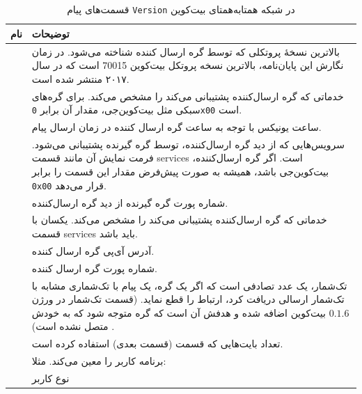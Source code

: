  	
 \begin{xltabular}{\textwidth}{|c|X|}
 	\caption{
	قسمت‌های پیام \texttt{Version} در شبکه همتا‌به‌همتای بیت‌کوین
\label{table:VersionMessage}}\\
\hline
\textbf{نام} & {\centering
	\textbf{توضیحات}		
} \\
\hline
\hline
{} & {
	بالاترین نسخهٔ پروتکلی که توسط گره ارسال کننده شناخته می‌شود.	در زمان نگارش این پایان‌نامه، بالاترین نسخه پروتکل بیت‌کوین 70015 است که در سال ۲۰۱۷ منتشر شده است.
} \\
\hline
{} & {
	خدماتی که گره ارسال‌کننده پشتیبانی می‌کند را مشخص می‌کند. برای گره‌های سبکی مثل بیت‌کوین‌جی، مقدار آن برابر \texttt{0x00} است.
} \\
\hline
{} & {
	ساعت یونیکس با توجه به ساعت گره ارسال کننده در زمان ارسال پیام.
} \\
\hline
{} & {
	سرویس‌هایی که از دید گره ارسال‌کننده، توسط گره گیرنده پشتیبانی می‌شود. فرمت نمایش آن مانند قسمت services است. اگر گره ارسال‌کننده، بیت‌کوین‌جی باشد، همیشه به صورت پیش‌فرض مقدار این قسمت را برابر \texttt{0x00} قرار می‌دهد.
} \\
\hline
{} & {
	شماره پورت گره گیرنده از دید گره ارسال‌کننده.
}\\
\hline
{} & {
	خدماتی که گره ارسال‌کننده پشتیبانی می‌کند را مشخص می‌کند. یکسان با قسمت services باید باشد.
}\\

\hline
{} & {
	آدرس آی‌پی گره ارسال کننده.
}\\

\hline
{} & {
	شماره پورت گره ارسال کننده.
}\\

\hline
{} & {
	تک‌شمار، یک عدد تصادفی است که اگر یک گره،‌ یک پیام با تک‌شماری مشابه با تک‌شمار ارسالی دریافت کرد، ارتباط را قطع نماید. (قسمت تک‌شمار در ورژن $0.1.6$ بیت‌کوین اضافه شده و هدفش آن است که گره متوجه شود که به خودش متصل نشده است)
	.
}\\
\hline
{} & {
	تعداد بایت‌هایی که قسمت  (قسمت بعدی) استفاده کرده است.
}\\

\hline
{} & {
	برنامه کاربر را معین می‌کند. مثلا:
	

}\\

\hline
{} & {
	نوع کاربر 
}\\

\hline
 \end{xltabular}


